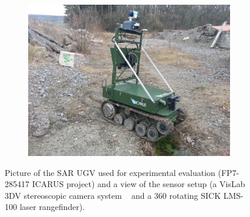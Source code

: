 \documentclass{article}
\begin{document}
\begin{figure}[h]
\begin{subfigure} [rt]{0.44\textwidth}
         \includegraphics[scale=0.06]{ROB-15-0035_fig17c}
 \end{subfigure}

\caption{Picture of the SAR UGV used for experimental evaluation (FP7-285417 ICARUS project) and a view of the sensor setup (a VisLab 3DV stereoscopic camera system ~\cite{itsc2013} and a 360 rotating SICK LMS-100 laser rangefinder).}
\label{fig:tEODorbasic}
\end{figure}
\end{document}
